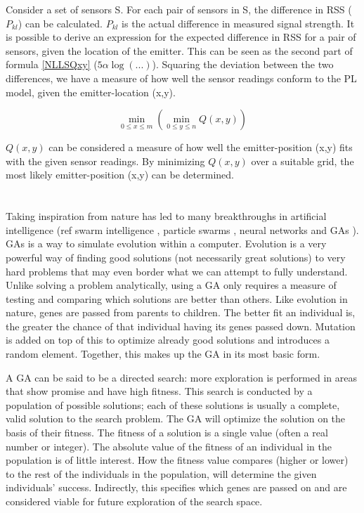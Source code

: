 \documentclass[10pt,a4paper]{book}
\begin{document}
Consider a set of sensors S. For each pair of sensors in S, the difference in \gls{RSS} ($P_{kl}$) can be calculated. $P_{kl}$ is the actual difference in measured signal strength. It is possible to derive an expression for the expected difference in \gls{RSS} for a pair of sensors, given the location of the emitter. This can be seen as the second part of formula \ref{NLLSQxy} ($5 \alpha \log (...)$). Squaring the deviation between the two differences, we have a measure of how well the sensor readings conform to the \gls{PL} model, given the emitter-location (x,y). 

\begin{equation}
\min\limits_{0\leq x\leq m}( \min\limits_{0\leq y\leq n} Q(x,y))\label{NLLSMin}
\end{equation}

$Q(x,y)$ can be considered a measure of how well the emitter-position (x,y) fits with the given sensor readings. By minimizing $Q(x,y)$ over a suitable grid, the most likely emitter-position (x,y) can be determined.


\newpage

\section{}

Taking inspiration from nature has led to many breakthroughs in artificial intelligence (ref swarm intelligence \citep{bonabeau1999swarm,kennedy2001swarm}, particle swarms \citep{eberhart1995new,shi1998modified}, neural networks and \glspl{GA} \citep{eiben2003introduction,goldberg1988genetic}). \Glspl{GA} is a way to simulate evolution within a computer. Evolution is a very powerful way of finding good solutions (not necessarily great solutions) to very hard problems that may even border what we can attempt to fully understand. Unlike solving a problem analytically, using a \gls{GA} only requires a measure of testing and comparing which solutions are better than others. Like evolution in nature, genes are passed from parents to children. The better fit an individual is, the greater the chance of that individual having its genes passed down. Mutation is added on top of this to optimize already good solutions and introduces a random element. Together, this makes up the \gls{GA} in its most basic form.

A \gls{GA} can be said to be a directed search: more exploration is performed in areas that show promise and have high fitness. This search is conducted by a population of possible solutions; each of these solutions is usually a complete, valid solution to the search problem. The \gls{GA} will optimize the solution on the basis of their fitness. The fitness of a solution is a single value (often a real number or integer). The absolute value of the fitness of an individual in the population is of little interest. How the fitness value compares (higher or lower) to the rest of the individuals in the population, will determine the given individuals' success. Indirectly, this specifies which genes are passed on and are considered viable for future exploration of the search space.
\end{document}
